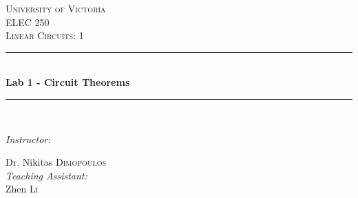 \documentclass[12pt]{article}
\begin{document}
\begin{titlepage}

\newcommand{\HRule}{\rule{\linewidth}{0.5mm}} %

\center %
 

\textsc{\LARGE University of Victoria}\\[1cm] %
\textsc{\Large ELEC 250}\\[0.5cm] %
\textsc{\large Linear Circuits: 1}\\[0.5cm] %


\HRule \\[0.4cm]
{ \huge \bfseries Lab 1 - Circuit Theorems}\\[0.2cm] %
\HRule \\[1.5cm]
 
\begin{minipage}{0.4\textwidth}
 
\begin{flushleft} \large\emph{Instructor:}
 
Dr. Nikitas \textsc{Dimopoulos} \\
\vspace{12 pt}
\emph{Teaching Assistant:} \\
Zhen \textsc{Li}
\end{flushleft}
\end{minipage}
~
\begin{minipage}{0.4\textwidth}
\begin{flushright} \large
\vspace{12 pt}
\end{flushright}
\end{minipage}\\[1.5cm]


\end{titlepage}
\end{document}
